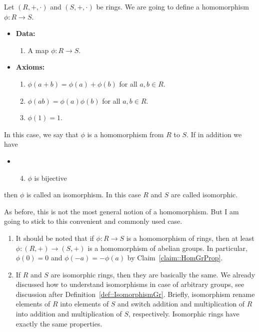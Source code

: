 \begin{definition}
Let $(R, +, \cdot)$ and $(S, +, \cdot)$ be rings.
We are going to define a homomorphism $\phi\colon R\to S$.
\begin{itemize}
\item\textbf{Data:} 
\begin{enumerate}
\item A map $\phi\colon R\to S$.
\end{enumerate}

\item\textbf{Axioms:}
\begin{enumerate}
\item $\phi(a + b) = \phi(a) + \phi(b)$ for all $a, b\in R$.

\item $\phi(ab) = \phi(a)\phi(b)$ for all $a,b\in R$.

\item $\phi(1) = 1$.
\end{enumerate}
\end{itemize}
In this case, we say that $\phi$ is a homomorphism from $R$ to $S$.
If in addition we have
\begin{itemize}
\item[]
\begin{enumerate}
\setcounter{enumi}{3}
\item $\phi$ is bijective
\end{enumerate}
\end{itemize}
then $\phi$ is called an isomorphism.
In this case $R$ and $S$ are called isomorphic.
\end{definition}

As before, this is not the most general notion of a homomorphism.
But I am going to stick to this convenient and commonly used case.

\begin{remarks}
\begin{enumerate}
\item It should be noted that if $\phi\colon R\to S$ is a homomorphism of rings, then at least $\phi\colon (R,+) \to (S, +)$ is a homomorphism of abelian groups.
In particular, $\phi(0) = 0$ and $\phi(-a) = - \phi(a)$ by Claim~\ref{claim::HomGrProp}.

\item If $R$ and $S$ are isomorphic rings, then they are basically the same.
We already discussed how to understand isomorphisms in case of arbitrary groups, see discussion after Definition~\ref{def::IsomorphismGr}.
Briefly, isomorphism rename elements of $R$ into elements of $S$ and switch addition and multiplication of $R$ into addition and multiplication of $S$, respectively.
Isomorphic rings have exactly the same properties.
\end{enumerate}
\end{remarks}

